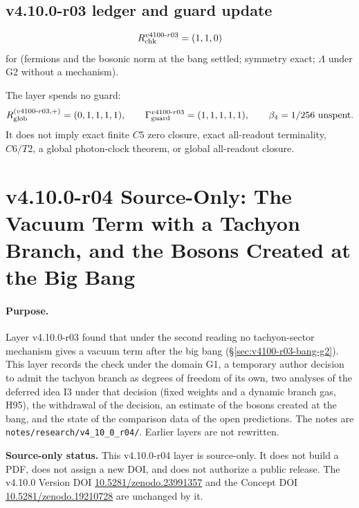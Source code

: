 \subsection*{v4.10.0-r03 ledger and guard update}
\label{subsec:v4100-r03-ledger-guard}

\[
R_{\rm chk}^{v4100\text{-}r03}=(1,1,0)
\]
for (fermions and the bosonic norm at the bang settled; symmetry exact; \(\Lambda\) under G2 without a mechanism).

The layer spends no guard:
\[
R_{\rm glob}^{(v4100\text{-}r03,+)}=(0,1,1,1,1),
\qquad
\Gamma_{\rm guard}^{v4100\text{-}r03}=(1,1,1,1,1),
\qquad
\beta_4=1/256\ \text{unspent}.
\]
It does not imply exact finite \(C5\) zero closure, exact all-readout terminality,
\(C6/T2\), a global photon-clock theorem, or global all-readout closure.

\clearpage
\section*{v4.10.0-r04 Source-Only: The Vacuum Term with a Tachyon Branch, and the Bosons Created at the Big Bang}
\label{sec:v4100-r04-tachyon-branch}

\paragraph{Purpose.}
Layer v4.10.0-r03 found that under the second reading no tachyon-sector mechanism gives a vacuum term after the big bang
(\S\ref{sec:v4100-r03-bang-g2}).  This layer records the check under the domain G1, a temporary author decision to admit the tachyon branch
as degrees of freedom of its own, two analyses of the deferred idea I3 under that decision (fixed weights and a dynamic branch gas, H95),
the withdrawal of the decision, an estimate of the bosons created at the bang, and the state of the comparison data of the open predictions.
The notes are \texttt{notes/\allowbreak research/\allowbreak v4\_10\_0\_r04/}.  Earlier layers are not rewritten.

\noindent\textbf{Source-only status.}
This v4.10.0-r04 layer is source-only.  It does not build a PDF, does not assign a new DOI,
and does not authorize a public release.  The v4.10.0 Version DOI
\href{https://doi.org/10.5281/zenodo.23991357}{10.5281/zenodo.23991357} and the Concept DOI
\href{https://doi.org/10.5281/zenodo.19210728}{10.5281/zenodo.19210728} are unchanged by it.

